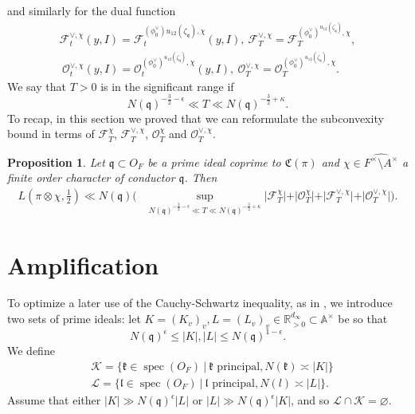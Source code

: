 \documentclass[a4paper,11pt]{amsart}
\newtheorem{proposition}[theorem]{Proposition}
\theoremstyle{definition}
\newcommand{\A}{\mathbb{A}}
\newcommand{\R}{\mathbb{R}}
\begin{document}
and similarly for the dual function 
\begin{align*}\mathcal{F}_t^{\vee,\chi}(y,I) = \mathcal{F
}_t^{(\phi^\vee_0){u_{12}(\zeta_\mathfrak q)},\chi}(y,I),\ \mathcal{F}_T^{\vee,\chi} = \mathcal{F
}_T^{(\phi^\vee_0)^{u_{12}(\zeta_\mathfrak q)},\chi},\\ \ \mathcal O_t^{\vee,\chi}(y,I) = \mathcal{O}_t^{(\phi^\vee_0)^{u_{12}(\zeta_\mathfrak q)},\chi}(y,I), \ \mathcal{O}_T^{\vee,\chi} = \mathcal{O}_T^{(\phi^{\vee}_0)^{u_{12}(\zeta_\mathfrak q)},\chi}. \end{align*}
We say that $T>0$ is in the significant range if \begin{equation}\label{eq:significant-range}N(\mathfrak{q})^{-\frac{3}{2}-\epsilon}\ll T\ll N(\mathfrak{q})^{-\frac{3}{2}+\kappa}.\end{equation}
To recap, in this section we proved that we can reformulate the subconvexity bound in terms of $\mathcal{F}_T^{\chi}$, $\mathcal{F}_T^{\vee,\chi}$, $\mathcal{O}_T^{\chi}$ and $\mathcal{O}_T^{\vee,\chi}$.
\begin{proposition}\label{prop:splitFandO}
  Let $\mathfrak{q} \subset O_F$ be a prime ideal coprime to $\mathfrak{C}(\pi)$ and $\chi \in \widehat {F^{\times}\setminus A^\times}$ a finite order character of conductor $\mathfrak{q}$. Then 
\begin{align*}
    L\left(\pi \otimes \chi,\frac{1}{2}\right) \ll N(\mathfrak{q})\bigg(&\operatorname{sup}_{N(\mathfrak{   q})^{-\frac{3}{2}-\epsilon}\ll T\ll N(\mathfrak{q})^{-\frac{3}{2}+\kappa}}\vert \mathcal{F}_T^{\chi} \vert + \vert \mathcal{O}_T^{\chi} \vert + \vert\mathcal{F}_T^{\vee,\chi}\vert + \vert \mathcal{O}_T^{\vee,\chi}\vert\bigg) . 
\end{align*}
\end{proposition}





\section{Amplification}\label{sec:amplification}
To optimize a later use of the Cauchy-Schwartz inequality, as in \cite[Section 3.3]{nelsonholowinsky}, we introduce two sets of prime ideals: let $K = (K_v)_v, L= (L_v)_v \in \R_{>0}^{d_{\infty}}\subset \A^{\times}$ be so that \[N(\mathfrak{q})^{\epsilon} \leq \vert{K}\vert,\vert{L}\vert \leq N(\mathfrak{q})^{1-\epsilon}.\]
We define
\begin{align*}
    &\mathcal{K} = \{ \mathfrak{k} \in  \operatorname{spec}(O_F)\ |\ \mathfrak{k} \text{ principal}, N(\mathfrak{k})\asymp \vert{K}\vert\}\\   &\mathcal{L} = \{\mathfrak{l} \in \operatorname{spec}(O_F)\ | \ \mathfrak{l} \text{ principal},  N(l)\asymp \vert{L}\vert\}.
\end{align*} 
Assume that either $\vert{K}\vert \gg N(\mathfrak{q})^{\epsilon}\vert{L}\vert$ or $\vert{L}\vert\gg N(\mathfrak{q})^{\epsilon}\vert{K}\vert$, and so $\mathcal{L}\cap \mathcal{K} = \varnothing$. 
\end{document}
